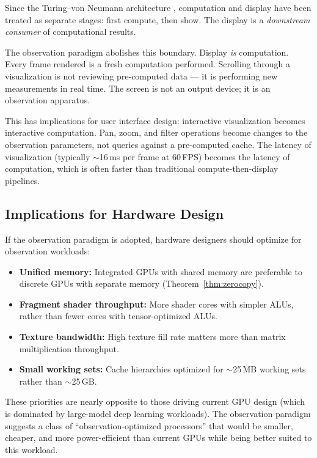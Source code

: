\documentclass[11pt,twocolumn,a4paper]{article}
\begin{document}
Since the Turing--von Neumann architecture \citep{turing1937,
vonneumann1945}, computation and display have been treated as
separate stages: first compute, then show. The display is a
\emph{downstream consumer} of computational results.

The observation paradigm abolishes this boundary. Display \emph{is}
computation. Every frame rendered is a fresh computation performed.
Scrolling through a visualization is not reviewing pre-computed data
--- it is performing new measurements in real time. The screen is not
an output device; it is an observation apparatus.

This has implications for user interface design: interactive
visualization becomes interactive computation. Pan, zoom, and filter
operations become changes to the observation parameters, not queries
against a pre-computed cache. The latency of visualization (typically
$\sim$16\,ms per frame at 60\,FPS) becomes the latency of
computation, which is often faster than traditional compute-then-display
pipelines.

\subsection{Implications for Hardware Design}

If the observation paradigm is adopted, hardware designers should
optimize for observation workloads:
\begin{itemize}[leftmargin=*]
\item \textbf{Unified memory:} Integrated GPUs with shared memory
  are preferable to discrete GPUs with separate memory
  (Theorem~\ref{thm:zerocopy}).
\item \textbf{Fragment shader throughput:} More shader cores with
  simpler ALUs, rather than fewer cores with tensor-optimized ALUs.
\item \textbf{Texture bandwidth:} High texture fill rate matters
  more than matrix multiplication throughput.
\item \textbf{Small working sets:} Cache hierarchies optimized for
  $\sim$25\,MB working sets rather than $\sim$25\,GB.
\end{itemize}
These priorities are nearly opposite to those driving current GPU
design (which is dominated by large-model deep learning workloads).
The observation paradigm suggests a class of ``observation-optimized
processors'' that would be smaller, cheaper, and more power-efficient
than current GPUs while being better suited to this workload.
\end{document}
